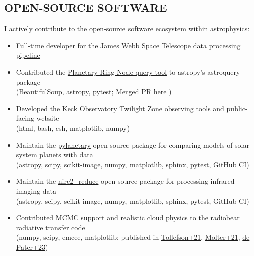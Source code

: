 \documentclass[margin, 10pt]{res} %
\newcommand\tab[1][1cm]{\hspace*{#1}}
\begin{document}
\begin{resume}

\section{OPEN-SOURCE SOFTWARE}

I actively contribute to the open-source software ecosystem within astrophysics:

\begin{itemize}
	

\item Full-time developer for the James Webb Space Telescope \href{https://jwst-pipeline.readthedocs.io/en/latest/}{data processing pipeline}

\item Contributed the \href{https://astroquery.readthedocs.io/en/latest/solarsystem/pds/pds.html}{Planetary Ring Node query tool} to astropy's astroquery package \\ 
\tab (BeautifulSoup, astropy, pytest; \href{https://github.com/astropy/astroquery/pull/2358}{Merged PR here} )

\item Developed the \href{https://www2.keck.hawaii.edu/inst/tda/TwilightZone.html#}{Keck Observatory Twilight Zone} observing tools and public-facing website \\ 
\tab (html, bash, csh, matplotlib, numpy)

\item Maintain the \href{https://github.com/emolter/pylanetary}{pylanetary} open-source package for comparing models of solar system planets with data \\
\tab (astropy, scipy, scikit-image, numpy, matplotlib, sphinx, pytest, GitHub CI)

\item Maintain the \href{https://github.com/emolter/nirc2_reduce}{nirc2\_reduce} open-source package for processing infrared imaging data \\
\tab (astropy, scipy, scikit-image, numpy, matplotlib, sphinx, pytest, GitHub CI)

\item Contributed MCMC support and realistic cloud physics to the \href{https://github.com/david-deboer/radiobear}{radiobear} radiative transfer code \\
\tab (numpy, scipy, emcee, matplotlib; published in \href{https://doi.org/10.3847/PSJ/abf837}{Tollefson+21}, \href{https://doi.org/10.3847/PSJ/abc48a}{Molter+21}, \href{https://doi.org/10.3390/rs15051313}{de Pater+23})


\end{itemize}
\end{resume}
\end{document}
